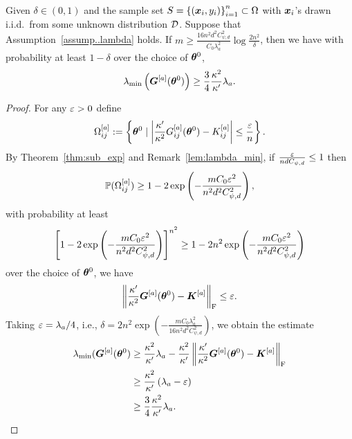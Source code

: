 \documentclass[twoside,11pt]{article}
\begin{document}
\begin{lem}\label{lem:exp_a}
    Given $\delta\in(0,1)$ and the sample set $S = {\{(\bm{x}_i, y_i)\}}_{i=1}^n\subset\Omega$ with $\bm{x}_i$'s drawn i.i.d.\ from some unknown distribution $\mathcal{D}$. Suppose that Assumption~\ref{assump..lambda} holds. If $m\geq\frac{16n^2d^2C_{\psi,d}^2}{C_0\lambda_a^2}\log\frac{2n^2}{\delta}$, then we have with probability at least $1-\delta$ over the choice of $\bm{\theta}^0$,
    \begin{equation}
        \lambda_{\min}\left(\bm{G}^{[a]}(\bm{\theta}^0)\right)\geq\frac{3}{4}\frac{\kappa^2}{\kappa'}\lambda_a.
    \end{equation}
\end{lem}
\begin{proof}
    For any $\varepsilon>0$ define
    \begin{equation}
        \Omega_{ij}^{[a]}:=\left\{\bm{\theta}^0\mid\left|\frac{\kappa'}{\kappa^2}G_{ij}^{[a]}(\bm{\theta}^0)-K_{ij}^{[a]}\right|\leq\frac{\varepsilon}{n}\right\}.
    \end{equation}
    By Theorem~\ref{thm:sub_exp} and Remark~\ref{lem:lambda_min}, if $\frac{\varepsilon}{ndC_{\psi,d}}\leq 1$ then
    \begin{equation*}
        \mathbb{P}(\Omega_{ij}^{[a]}) \geq 1-2\exp\left(-\frac{mC_0\varepsilon^2}{n^2d^2C^2_{\psi,d}}\right),
    \end{equation*}
    with probability at least
    \begin{equation*}
        \left[1-2\exp\left(-\frac{mC_0\varepsilon^2}{n^2 d^2 C^2_{\psi,d}}\right)\right]^{n^2}\geq 1-2n^2\exp\left(-\frac{mC_0\varepsilon^2}{n^2 d^2 C^2_{\psi,d}}\right)
    \end{equation*}
    over the choice of $\bm{\theta}^0$, we have
    \begin{equation*}
        \left\lVert\frac{\kappa'}{\kappa^2}\bm{G}^{[a]}(\bm{\theta}^0)-\bm{K}^{[a]}\right\rVert_\mathrm{F}\leq\varepsilon.
    \end{equation*}
    Taking $\varepsilon=\lambda_a/4$, i.e., $\delta=2n^2\exp\left(-\frac{mC_0\lambda_a^2}{16n^2d^2C^2_{\psi,d}}\right)$, we obtain the estimate
    \begin{equation*}
        \begin{aligned}
            \lambda_{\min}(\bm{G}^{[a]}(\bm{\theta}^0)
             & \geq \frac{\kappa^2}{\kappa'}\lambda_a-\frac{\kappa^2}{\kappa'}\left\lVert\frac{\kappa'}{\kappa^2}\bm{G}^{[a]}(\bm{\theta}^0)-\bm{K}^{[a]}\right\rVert_\mathrm{F} \\
             & \geq \frac{\kappa^2}{\kappa'}\left(\lambda_a-\varepsilon\right)                                                                                \\
             & \geq\frac{3}{4}\frac{\kappa^2}{\kappa'}\lambda_a.
        \end{aligned}
    \end{equation*}
\end{proof}
\end{document}
